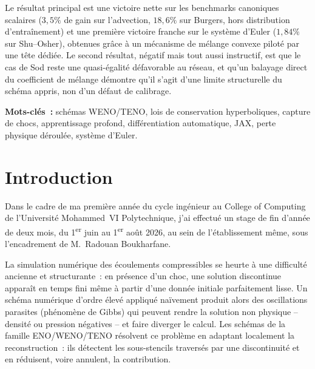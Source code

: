 \documentclass[12pt,a4paper,oneside]{report}
\begin{document}
Le résultat principal est une victoire nette sur les benchmarks canoniques
scalaires ($3{,}5\%$ de gain sur l'advection, $18{,}6\%$ sur Burgers, hors
distribution d'entraînement) et une première victoire franche sur le système
d'Euler ($1{,}84\%$ sur Shu--Osher), obtenues grâce à un mécanisme de mélange
convexe piloté par une tête dédiée. Le second résultat, négatif mais tout aussi
instructif, est que le cas de Sod reste une quasi-égalité défavorable au réseau,
et qu'un balayage direct du coefficient de mélange démontre qu'il s'agit d'une
limite structurelle du schéma appris, non d'un défaut de calibrage.

\vspace{0.6em}
\textbf{Mots-clés~:} schémas WENO/TENO, lois de conservation hyperboliques,
capture de chocs, apprentissage profond, différentiation automatique, JAX,
perte physique déroulée, système d'Euler.

\tableofcontents
\listoffigures
{}
\listoftables
{}


\cleardoublepage
{}
\setcounter{page}{1}
\pagestyle{main}

\chapter*{Introduction}

Dans le cadre de ma première année du cycle ingénieur au College of Computing
de l'Université Mohammed~VI Polytechnique, j'ai effectué un stage de fin
d'année de deux mois, du 1\textsuperscript{er} juin au
1\textsuperscript{er} août 2026, au sein de l'établissement même, sous
l'encadrement de M.~Radouan Boukharfane.

La simulation numérique des écoulements compressibles se heurte à une
difficulté ancienne et structurante~: en présence d'un choc, une solution
discontinue apparaît en temps fini même à partir d'une donnée initiale
parfaitement lisse. Un schéma numérique d'ordre élevé appliqué naïvement
produit alors des oscillations parasites (phénomène de Gibbs) qui peuvent
rendre la solution non physique -- densité ou pression négatives -- et faire
diverger le calcul. Les schémas de la famille ENO/WENO/TENO résolvent ce
problème en adaptant localement la reconstruction~: ils détectent les
sous-stencils traversés par une discontinuité et en réduisent, voire
annulent, la contribution.
\end{document}

